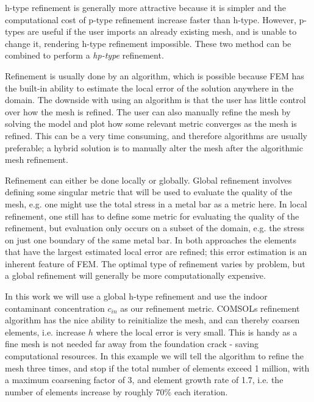 h-type refinement is generally more attractive because it is simpler and the computational cost of p-type refinement increase faster than h-type.
However, p-types are useful if the user imports an already existing mesh, and is unable to change it, rendering h-type refinement impossible.
These two method can be combined to perform a \textit{hp-type} refinement.\par

Refinement is usually done by an algorithm, which is possible because FEM has the built-in ability to estimate the local error of the solution anywhere in the domain.
The downside with using an algorithm is that the user has little control over how the mesh is refined.
The user can also manually refine the mesh by solving the model and plot how some relevant metric converges as the mesh is refined.
This can be a very time consuming, and therefore algorithms are usually preferable; a hybrid solution is to manually alter the mesh after the algorithmic mesh refinement.\par

Refinement can either be done locally or globally.
Global refinement involves defining some singular metric that will be used to evaluate the quality of the mesh, e.g. one might use the total stress in a metal bar as a metric here.
In local refinement, one still has to define some metric for evaluating the quality of the refinement, but evaluation only occurs on a subset of the domain, e.g. the stress on just one boundary of the same metal bar.
In both approaches the elements that have the largest estimated local error are refined; this error estimation is an inherent feature of FEM.
The optimal type of refinement varies by problem, but a global refinement will generally be more computationally expensive.\par

In this work we will use a global h-type refinement and use the indoor contaminant concentration $c_{in}$ as our refinement metric.
COMSOLs refinement algorithm has the nice ability to reinitialize the mesh, and can thereby coarsen elements, i.e. increase $h$ where the local error is very small.
This is handy as a fine mesh is not needed far away from the foundation crack - saving computational resources.
In this example we will tell the algorithm to refine the mesh three times, and stop if the total number of elements exceed 1 million, with a maximum coarsening factor of 3, and element growth rate of 1.7, i.e. the number of elements increase by roughly 70\% each iteration.\par


